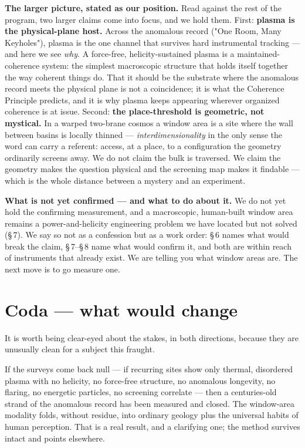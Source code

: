 \documentclass[11pt]{article}
\begin{document}
\textbf{The larger picture, stated as our position.} Read against the rest of the program, two larger claims come into focus, and we hold them. First: \textbf{plasma is the physical-plane host.} Across the anomalous record ("One Room, Many Keyholes"), plasma is the one channel that survives hard instrumental tracking --- and here we see \emph{why}. A force-free, helicity-sustained plasma is a maintained-coherence system: the simplest macroscopic structure that holds itself together the way coherent things do. That it should be the substrate where the anomalous record meets the physical plane is not a coincidence; it is what the Coherence Principle predicts, and it is why plasma keeps appearing wherever organized coherence is at issue. Second: \textbf{the place-threshold is geometric, not mystical.} In a warped two-brane cosmos a window area is a site where the wall between basins is locally thinned --- \emph{interdimensionality} in the only sense the word can carry a referent: access, at a place, to a configuration the geometry ordinarily screens away. We do not claim the bulk is traversed. We claim the geometry makes the question physical and the screening map makes it findable --- which is the whole distance between a mystery and an experiment.

\textbf{What is not yet confirmed --- and what to do about it.} We do not yet hold the confirming measurement, and a macroscopic, human-built window area remains a power-and-helicity engineering problem we have located but not solved (\S\,7). We say so not as a confession but as a work order: \S\,6 names what would break the claim, \S\,7--\S\,8 name what would confirm it, and both are within reach of instruments that already exist. We are telling you what window areas are. The next move is to go measure one.

\section*{Coda --- what would change}
It is worth being clear-eyed about the stakes, in both directions, because they are unusually clean for a subject this fraught.

If the surveys come back null --- if recurring sites show only thermal, disordered plasma with no helicity, no force-free structure, no anomalous longevity, no flaring, no energetic particles, no screening correlate --- then a centuries-old strand of the anomalous record has been measured and closed. The window-area modality folds, without residue, into ordinary geology plus the universal habits of human perception. That is a real result, and a clarifying one; the method survives intact and points elsewhere.
\end{document}
